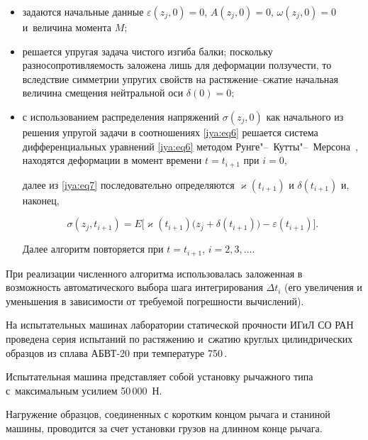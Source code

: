 \begin{itemize}

\item[1)] задаются начальные данные $\varepsilon(z_j,0)=0$, $A(z_j,0)=0$, $\omega(z_j,0)=0$ и~величина момента $M$;

\item[2)] решается упругая задача чистого изгиба балки; поскольку разносопротивляемость заложена лишь для деформации ползучести, то вследствие симметрии упругих свойств на растяжение--сжатие начальная величина смещения нейтральной оси $\delta(0)=0$; 

\item[3)] с использованием распределения напряжений $\sigma(z_j,0)$ как начального из решения упругой задачи в соотношениях \eqref{iya:eq6} решается система дифференциальных уравнений \eqref{iya:eq6} методом Рунге"--~Кутты"--~Мерсона~\cite{iya:Runge}, находятся деформации в момент времени $t=t_{i+1}$ при $i=0$, 

далее из \eqref{iya:eq7} последовательно определяются $\varkappa(t_{i+1})$ и $\delta(t_{i+1})$ и, наконец,

$$\sigma(z_j,t_{i+1})=E \bigl[\varkappa(t_{i+1})\bigl(z_j+\delta(t_{i+1})\bigr)-\varepsilon(t_{i+1})\bigr].$$

Далее алгоритм повторяется при $t=t_{i+1}$, $i=2,3,\dots$.

\end{itemize}

 

 При реализации численного алгоритма использовалась заложенная в~\cite{iya:Runge} возможность автоматического выбора шага интегрирования $\Delta t_i$ (его увеличения и уменьшения в зависимости от требуемой погрешности вычислений).

 

\smallskip 

 






На испытательных машинах лаборатории статической прочности ИГиЛ СО РАН проведена серия испытаний по растяжению и~сжатию круглых цилиндрических образцов из  сплава АБВТ-20 при температуре  750\,\textcelsius. 

Испытательная машина представляет собой установку рычажного типа с~максимальным усилием 50\,000~Н. 

Нагружение образцов, соединенных с коротким концом рычага и станиной машины, проводится за счет установки грузов на длинном конце рычага. 



